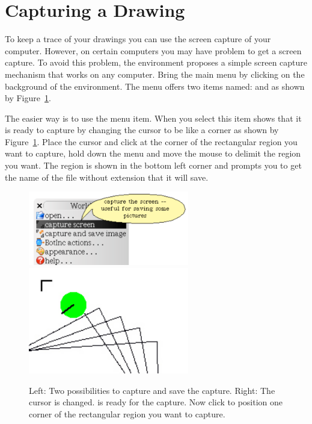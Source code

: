 \section{Capturing a Drawing}
To keep a trace of your drawings you can use the screen capture of your computer. However, on certain computers you may have problem to get a screen capture. To avoid this problem, the environment proposes a simple screen capture mechanism that works on any computer. Bring the main menu by clicking on the background of the environment. The menu offers two items named:  and  as shown by Figure~\ref{screenCapture}. 

The easier way is to use the  menu item. When you select this item \sq shows that it is ready to capture by changing the cursor to be like a corner as shown by Figure~\ref{screenCapture}. Place the cursor and click at the corner of the rectangular region you want to capture, hold down the menu and move the mouse to delimit the region you want. The region is shown in the bottom left corner and \sq prompts you to get the name of the file without extension that it will save.

\begin{figure}[h]
\begin{center}
\includegraphics[width=7cm]{screenCapture} \includegraphics[width=7cm]{positioningScreen}
\caption{Left: Two possibilities to capture and save the capture. Right: The cursor is changed. \sq is ready for the capture. Now click to position one corner of the rectangular region you want to capture.}\label{screenCapture}
\end{center}
\end{figure}


